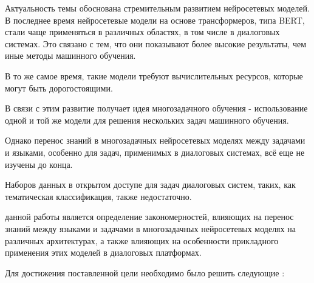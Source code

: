 {\actuality} 
Актуальность темы обоснована стремительным развитием нейросетевых моделей.
В последнее время нейросетевые модели на основе трансформеров, типа BERT, стали чаще применяться в различных областях, в том числе в диалоговых системах. Это связано с тем, что они показывают более высокие результаты, чем иные методы машинного обучения. 

В то же самое время, такие модели требуют вычислительных ресурсов, которые могут быть дорогостоящими.

В связи с этим развитие получает идея многозадачного обучения - использование одной и той же модели для решения нескольких задач машинного обучения. 

Однако перенос знаний в многозадачных нейросетевых моделях между задачами и языками, особенно для задач, применимых в диалоговых системах, всё еще не изучены до конца. 

Наборов данных в открытом доступе для задач диалоговых систем, таких, как тематическая классификация, также недостаточно.


{\aim} данной работы является определение закономерностей, влияющих на перенос знаний между языками и задачами в многозадачных нейросетевых моделях на различных архитектурах, а также влияющих на особенности прикладного применения этих моделей в диалоговых платформах.

Для достижения поставленной цели необходимо было решить следующие {\tasks}:


